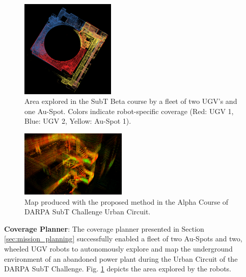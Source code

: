 \documentclass[letterpaper, 10pt, conference]{ieeeconf}      %
\newcommand{\ph}[1]{{\textbf{#1}:}} %
\newcommand{\rev}[1]{{\color{blue} #1 }} %
\begin{document}
\begin{figure}[t!]
  \centering
  \includegraphics[width=0.4\textwidth]{spot_iros/graphics/coverage_matteo.png}
  \caption{\rev{Area explored in the SubT Beta course by a fleet of two UGV's and one Au-Spot. Colors indicate robot-specific coverage (Red: UGV 1, Blue: UGV 2, Yellow: Au-Spot 1).}}
  \label{fig:exploration_planner_topview}
\end{figure}

\begin{figure}[t!]  %
  \centering
  \includegraphics[width=0.45\textwidth]{graphics/spot_alpha_course_stairs.PNG}
  \caption{Map produced with the proposed method in the Alpha Course of DARPA SubT Challenge Urban Circuit.}
  \label{fig:alpha_course_stairs_map}
\end{figure}



\ph{Coverage Planner}
The coverage planner presented in Section \ref{sec:mission_planning} successfully enabled a fleet of two Au-Spots and \rev{two, wheeled UGV robots} to autonomously explore and map the underground environment of an abandoned power plant during the Urban Circuit of the DARPA SubT Challenge. Fig. \ref{fig:exploration_planner_topview} \rev{depicts the area explored by the robots.}
\end{document}
